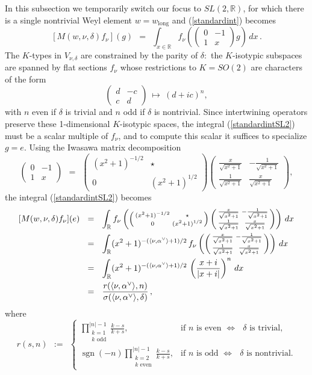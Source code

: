 \documentclass[12pt]{article}
\numberwithin{equation}{section}
\renewcommand\a{\alpha}
\newcommand\f{\frac}
\newcommand\smallf[2]{{\textstyle{\frac{#1}{#2}}}}
\newcommand{\R}{{\mathbb{R}}}
\renewcommand\({\left(}
\renewcommand\){\right)}
\newcommand{\ttwo}[4]{
\(\begin{smallmatrix}{#1} & {#2}
\\ {#3} & {#4} \end{smallmatrix}\)}
\newcommand{\sgn}{\operatorname{sgn}}
\begin{document}
In this subsection we temporarily switch our focus to  $SL(2,\R)$, for which there is a single nontrivial Weyl element $w=w_{\text{long}}$ and (\ref{standardint}) becomes
\begin{equation}\label{standardintSL2}
  [M(w,\nu,\delta)f_{\nu}](g) \ \ = \ \ \int_{x\in\R} f_\nu\(\ttwo{0}{-1}{1}{x} g\)\,dx\,.
\end{equation}
The $K$-types in $V_{\nu,\delta}$ are constrained by the parity of $\delta$:~the $K$-isotypic subspaces are spanned by flat sections $f_\nu$ whose restrictions to $K=SO(2)$ are characters of the form
\begin{equation}\label{Kisotypic}
 \ttwo{d}{-c}{c}{d} \ \mapsto \ (d+ic)^n,
\end{equation}
with $n$ even if $\delta$ is trivial and $n$ odd if $\delta$ is nontrivial.  Since intertwining operators preserve these 1-dimensional $K$-isotypic spaces, the integral (\ref{standardintSL2})   must be a scalar multiple of $f_\nu$, and to compute this scalar it suffices to specialize $g=e$.  Using the Iwasawa matrix decomposition
\begin{equation}\label{SL2matrix}
  \ttwo{0}{-1}{1}{x}  \ \ = \ \ \ttwo{(x^2+1)^{-1/2}}{\star}{0}{(x^2+1)^{1/2}} \ttwo{\frac{x}{\sqrt{x^2+1}}}{-\frac{1}{\sqrt{x^2+1}}}{
\frac{1}{\sqrt{x^2+1}}}{\frac{x}{\sqrt{x^2+1}}},
\end{equation}
 the integral (\ref{standardintSL2}) becomes
\begin{equation}\label{standardintSL2explicated}
\aligned
  [M(w,\nu,\delta)f_{\nu}](e) \ \ & = \ \ \int_{\R} f_\nu\(\ttwo{(x^2+1)^{-1/2}}{\star}{0}{(x^2+1)^{1/2}} \ttwo{\frac{x}{\sqrt{x^2+1}}}{-\frac{1}{\sqrt{x^2+1}}}{
\frac{1}{\sqrt{x^2+1}}}{\frac{x}{\sqrt{x^2+1}}}\)\,dx\\
& = \ \  \int_{\R}(x^2+1)^{-(\langle \nu,\a^\vee\rangle+1)/2}\, f_\nu\( \ttwo{\frac{x}{\sqrt{x^2+1}}}{-\frac{1}{\sqrt{x^2+1}}}{
\frac{1}{\sqrt{x^2+1}}}{\frac{x}{\sqrt{x^2+1}}}\) \,dx\\& = \ \  \int_{\R}(x^2+1)^{-(\langle \nu,\a^\vee\rangle+1)/2}\, \(\f{x+i}{|x+i|}\)^n \,dx\\
& = \ \ \frac{r(\langle \nu,\a^\vee\rangle,n)}{ \sigma(\langle \nu,\a^\vee\rangle,\delta)}\,,
\endaligned
\end{equation}
where
\begin{equation}\label{ras}
r(s,n) \ \ := \ \
\begin{cases}
 \displaystyle\prod_{\substack{k=1 \\ k\text{ odd}}}^{|n|-1}
\smallf{k-s}{k+s},
& \text{if $n$ is even $\Longleftrightarrow$ $\delta$ is trivial},\\[1.2em]
 \sgn(-n)\displaystyle\prod_{\substack{k=2 \\ k\text{ even}}}^{|n|-1}
\smallf{k - s}{k+s},
& \text{if $n$ is odd $\Longleftrightarrow$  $\delta$ is nontrivial}.
\end{cases}
\end{equation}
\end{document}
